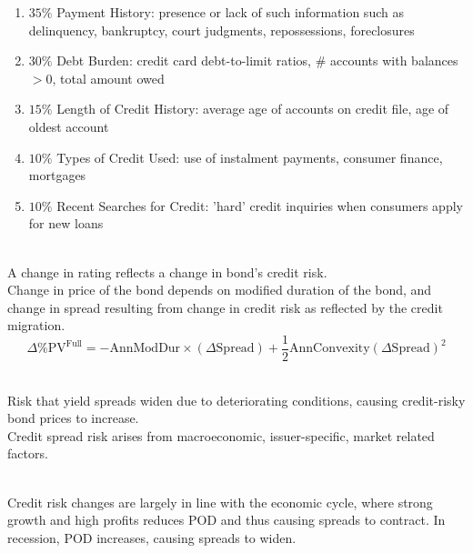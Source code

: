 \begin{remark} 
\begin{enumerate}[label=\roman*.]
\setlength{\itemsep}{0pt}
\item $35\%$ Payment History: presence or lack of such information such as delinquency, bankruptcy, court judgments, repossessions, foreclosures
\item $30\%$ Debt Burden: credit card debt-to-limit ratios, $\#$ accounts with balances $>0$, total amount owed
\item $15\%$ Length of Credit History: average age of accounts on credit file, age of oldest account
\item $10\%$ Types of Credit Used: use of instalment payments, consumer finance, mortgages
\item $10\%$ Recent Searches for Credit: 'hard' credit inquiries when consumers apply for new loans
\end{enumerate}
\end{remark}

\begin{definition} \\
A change in rating reflects a change in bond's credit risk.\\
Change in price of the bond depends on modified duration of the bond, and change in spread resulting from change in credit risk as reflected by the credit migration.
\begin{equation}
\Delta \% \text{PV}^{\text{Full}} = - \text{AnnModDur} \times (\Delta \text{Spread}) + \frac{1}{2} \text{AnnConvexity}(\Delta \text{Spread})^2 \nonumber
\end{equation}
\end{definition}

\begin{definition} \\
Risk that yield spreads widen due to deteriorating conditions, causing credit-risky bond prices to increase.\\
Credit spread risk arises from macroeconomic, issuer-specific, market related factors.
\end{definition}

\begin{remark} \\
Credit risk changes are largely in line with the economic cycle, where strong growth and high profits reduces POD and thus causing spreads to contract. In recession, POD increases, causing spreads to widen.
\end{remark}

